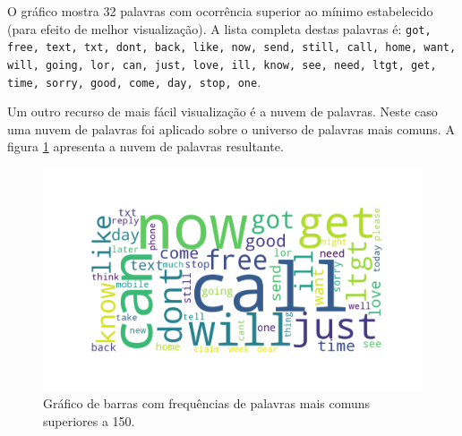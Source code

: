 \documentclass[a4paper,11pt]{article}
\begin{document}
O gráfico mostra 32 palavras com ocorrência superior ao mínimo estabelecido (para efeito de melhor
visualização). A lista completa destas palavras é: \texttt{got, free, text, txt, dont, back, 
like, now, send, still, call, home, want, will, going, lor, can, just, love, ill, know, see, need, 
ltgt, get, time, sorry, good, come, day, stop, one}.

Um outro recurso de mais fácil visualização é a nuvem de palavras. Neste caso uma nuvem de palavras
foi aplicado sobre o universo de palavras mais comuns. A figura \ref{fig:wordcloud} apresenta a 
nuvem de palavras resultante.


\begin{figure}[htbp]
    \centering
    \includegraphics[width=\textwidth]{word_cloud.png}
    \caption[Figura simples]{Gráfico de barras com frequências de palavras mais comuns superiores 
    a 150.}
    \label{fig:wordcloud}
\end{figure}


 
\end{document}
